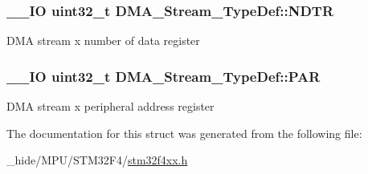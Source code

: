 \subsubsection[{N\+D\+T\+R}]{\setlength{\rightskip}{0pt plus 5cm}\+\_\+\+\_\+\+I\+O uint32\+\_\+t D\+M\+A\+\_\+\+Stream\+\_\+\+Type\+Def\+::\+N\+D\+T\+R}\label{struct_d_m_a___stream___type_def_a2cc2a52628182f9e79ab1e49bb78a1eb}
D\+M\+A stream x number of data register \hypertarget{struct_d_m_a___stream___type_def_adbeac1d47cb85ab52dac71d520273947}{}
\subsubsection[{P\+A\+R}]{\setlength{\rightskip}{0pt plus 5cm}\+\_\+\+\_\+\+I\+O uint32\+\_\+t D\+M\+A\+\_\+\+Stream\+\_\+\+Type\+Def\+::\+P\+A\+R}\label{struct_d_m_a___stream___type_def_adbeac1d47cb85ab52dac71d520273947}
D\+M\+A stream x peripheral address register 

The documentation for this struct was generated from the following file\+:\begin{DoxyCompactItemize}
\item 
\+\_\+hide/\+M\+P\+U/\+S\+T\+M32\+F4/\hyperlink{stm32f4xx_8h}{stm32f4xx.\+h}\end{DoxyCompactItemize}

